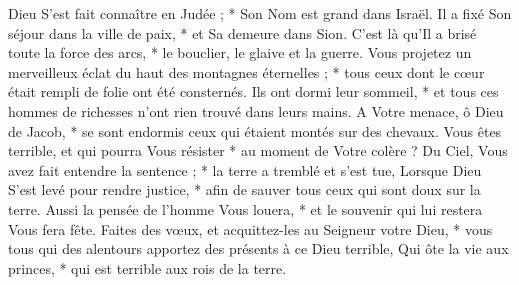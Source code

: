 Dieu S'est fait connaître en Judée ; * Son Nom est grand dans Israël.
\versseparator
 Il a fixé Son séjour dans la ville de paix, * et Sa demeure dans Sion.
\versseparator
 C'est là qu'Il a brisé toute la force des arcs, * le bouclier, le glaive et la guerre.
\versseparator
 Vous projetez un merveilleux éclat du haut des montagnes éternelles ; * tous ceux dont le cœur était rempli de folie ont été consternés.
\versseparator
 Ils ont dormi leur sommeil, * et tous ces hommes de richesses n'ont rien trouvé dans leurs mains.
\versseparator
 A Votre menace, ô Dieu de Jacob, * se sont endormis ceux qui étaient montés sur des chevaux.
\versseparator
 Vous êtes terrible, et qui pourra Vous résister * au moment de Votre colère ?
\versseparator
 Du Ciel, Vous avez fait entendre la sentence ; * la terre a tremblé et s'est tue,
\versseparator
 Lorsque Dieu S'est levé pour rendre justice, * afin de sauver tous ceux qui sont doux sur la terre.
\versseparator
 Aussi la pensée de l'homme Vous louera, * et le souvenir qui lui restera Vous fera fête.
\versseparator
 Faites des vœux, et acquittez-les au Seigneur votre Dieu, * vous tous qui des alentours apportez des présents à ce Dieu terrible,
\versseparator
 Qui ôte la vie aux princes, * qui est terrible aux rois de la terre.
